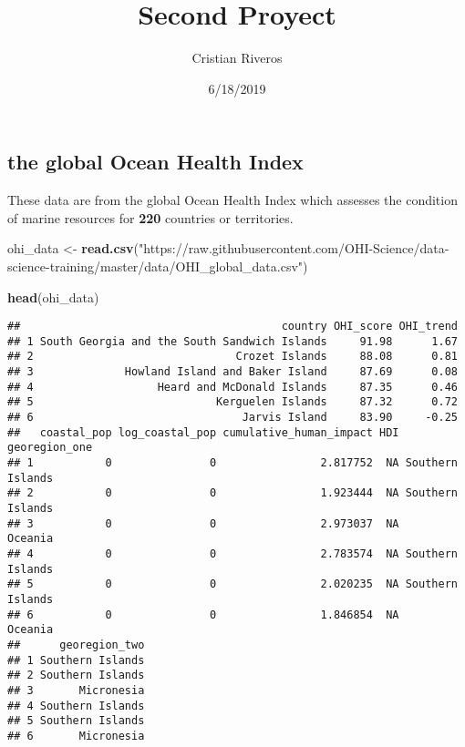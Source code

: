 \documentclass[]{article}
\title{Second Proyect}
\author{Cristian Riveros}
\date{6/18/2019}
\newenvironment{Shaded}{\begin{snugshade}}{\end{snugshade}}
\newcommand{\KeywordTok}[1]{\textcolor[rgb]{0.13,0.29,0.53}{\textbf{#1}}}
\newcommand{\NormalTok}[1]{#1}
\newcommand{\StringTok}[1]{\textcolor[rgb]{0.31,0.60,0.02}{#1}}
\begin{document}
\maketitle

\hypertarget{the-global-ocean-health-index}{%
\subsection{the global Ocean Health
Index}\label{the-global-ocean-health-index}}

These data are from the global Ocean Health Index which assesses the
condition of marine resources for \textbf{220} countries or territories.

\begin{Shaded}
\begin{Highlighting}[]
\NormalTok{ohi_data <-}\StringTok{ }\KeywordTok{read.csv}\NormalTok{(}\StringTok{"https://raw.githubusercontent.com/OHI-Science/data-science-training/master/data/OHI_global_data.csv"}\NormalTok{)}

\KeywordTok{head}\NormalTok{(ohi_data)}
\end{Highlighting}
\end{Shaded}

\begin{verbatim}
##                                        country OHI_score OHI_trend
## 1 South Georgia and the South Sandwich Islands     91.98      1.67
## 2                               Crozet Islands     88.08      0.81
## 3              Howland Island and Baker Island     87.69      0.08
## 4                   Heard and McDonald Islands     87.35      0.46
## 5                            Kerguelen Islands     87.32      0.72
## 6                                Jarvis Island     83.90     -0.25
##   coastal_pop log_coastal_pop cumulative_human_impact HDI    georegion_one
## 1           0               0                2.817752  NA Southern Islands
## 2           0               0                1.923444  NA Southern Islands
## 3           0               0                2.973037  NA          Oceania
## 4           0               0                2.783574  NA Southern Islands
## 5           0               0                2.020235  NA Southern Islands
## 6           0               0                1.846854  NA          Oceania
##      georegion_two
## 1 Southern Islands
## 2 Southern Islands
## 3       Micronesia
## 4 Southern Islands
## 5 Southern Islands
## 6       Micronesia
\end{verbatim}
\end{document}
